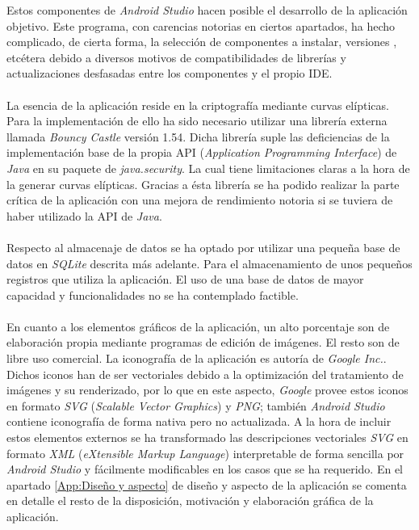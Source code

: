 \documentclass[../PFC.tex]{subfiles}
\begin{document}
Estos componentes de \textit{Android Studio} hacen posible el desarrollo de la aplicación objetivo. Este programa, con carencias notorias en ciertos apartados, ha hecho complicado, de cierta forma, la selección de componentes a instalar, versiones , etcétera debido a diversos motivos de compatibilidades de librerías y actualizaciones desfasadas entre los componentes y el propio IDE. 
\\\\
La esencia de la aplicación reside en la criptografía mediante curvas elípticas. Para la implementación de ello ha sido necesario utilizar una librería externa llamada \textit{Bouncy Castle}\cite{bouncyCastle} versión 1.54. Dicha librería suple las deficiencias de la implementación base de la propia API (\textit{Application Programming Interface}) de \textit{Java} en su paquete de \textit{java.security}\cite{javaSecurity}. La cual tiene limitaciones claras a la hora de la generar curvas elípticas. Gracias a ésta librería se ha podido realizar la parte crítica de la aplicación con una mejora de rendimiento notoria si se tuviera de haber utilizado la API de \textit{Java}. 
\\\\
Respecto al almacenaje de datos se ha optado por utilizar una pequeña base de datos en \textit{SQLite}\cite{sqlite} descrita más adelante. Para el almacenamiento de unos pequeños registros que utiliza la aplicación. El uso de una base de datos de mayor capacidad y funcionalidades no se ha contemplado factible. 
\\\\
En cuanto a los elementos gráficos de la aplicación, un alto porcentaje son de elaboración propia mediante programas de edición de imágenes. El resto son de libre uso comercial. La iconografía de la aplicación es autoría de \textit{Google Inc.}\cite{googleIcons}. Dichos iconos han de ser vectoriales debido a la optimización del tratamiento de imágenes y su renderizado, por lo que en este aspecto, \textit{Google} provee estos  iconos en formato \textit{SVG} (\textit{Scalable Vector Graphics}) y \textit{PNG}; también \textit{Android Studio} contiene iconografía de forma nativa pero no actualizada. A la hora de incluir estos elementos externos se ha transformado las descripciones vectoriales \textit{SVG} en formato \textit{XML} (\textit{eXtensible Markup Language}) interpretable de forma sencilla por \textit{Android Studio} y fácilmente modificables en los casos que se ha requerido. En el apartado \ref{App:Diseño y aspecto} de diseño y aspecto de la aplicación se comenta en detalle el resto de la disposición, motivación y elaboración gráfica de la aplicación. 
\end{document}
